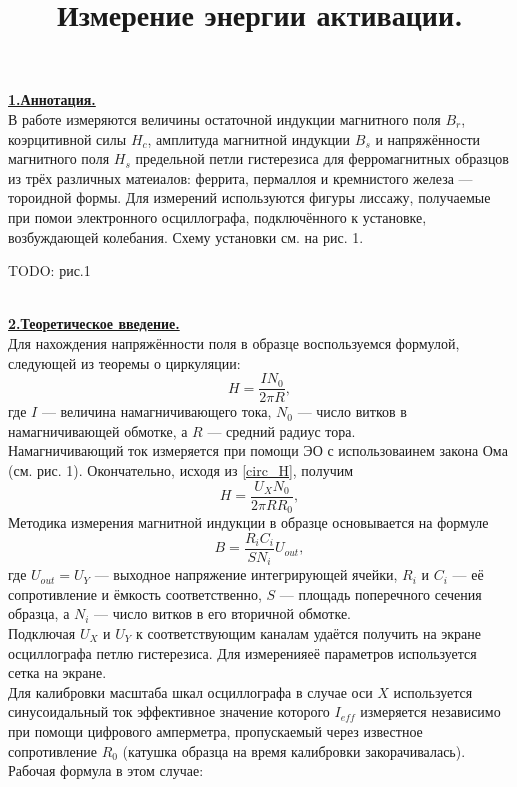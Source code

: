 \documentclass[12pt, letterpaper, oneside]{article}
\title{Измерение энергии активации.}
\begin{document}
\maketitle
\noindent\textbf{\underline{1.Аннотация.}}\\
В работе измеряются величины остаточной индукции магнитного поля $B_r$, коэрцитивной силы $H_c$, амплитуда магнитной индукции $B_s$ и напряжённости магнитного поля $H_s$ предельной петли гистерезиса для ферромагнитных образцов из трёх различных матеиалов: феррита, пермаллоя и кремнистого железа — тороидной формы. Для измерений используются фигуры лиссажу, получаемые при помои электронного осциллографа, подключённого к установке, возбуждающей колебания. Схему установки см. на рис. 1.\\
\begin{Huge}
TODO: рис.1
\end{Huge}\\
\textbf{\underline{2.Теоретическое введение.}}\\
Для нахождения напряжённости поля в образце воспользуемся формулой, следующей из теоремы о циркуляции:
\begin{equation}\label{circ_H}
H = \frac{I N_0}{2\pi R},
\end{equation}
где $I$ — величина намагничивающего тока, $N_0$ — число витков в намагничивающей обмотке, а $R$ — средний радиус тора.\\
Намагничивающий ток измеряется при помощи ЭО с использоваинем закона Ома (см. рис. 1). Окончательно, исходя из \ref{circ_H}, получим
\begin{equation}\label{X_formula}
H = \frac{U_X N_0}{2\pi R R_0},
\end{equation}
Методика измерения магнитной индукции в образце основывается на формуле
\begin{equation}\label{Y_formula}
B = \frac{R_i C_i}{S N_i}U_{out},
\end{equation}
где $U_{out} = U_Y$ — выходное напряжение интегрирующей ячейки, $R_i$ и $C_i$ — её сопротивление и ёмкость соответственно, $S$ — площадь поперечного сечения образца, а $N_i$ — число витков в его вторичной обмотке.\\
Подключая $U_X$ и $U_Y$ к соответствующим каналам удаётся получить на экране осциллографа петлю гистерезиса. Для измеренияеё параметров используется сетка на экране.\\
Для калибровки масштаба шкал осциллографа в случае оси $X$ используется синусоидальный ток эффективное значение которого $I_{eff}$ измеряется независимо при помощи цифрового амперметра, пропускаемый через известное сопротивление $R_0$ (катушка образца на время калибровки закорачивалась). Рабочая формула в этом случае:
\end{document}
